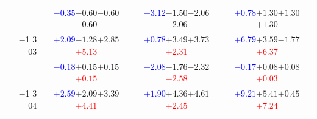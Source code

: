 \documentclass[compress]{beamer}
\begin{document}
\begin{frame}
\begin{tabular}{r | c | c | c}
          & \textcolor{blue}{$-0.35$}\hspace{0.1 cm}$-0.60$\hspace{0.1 cm}$-0.60$\hspace{0.1 cm}\textcolor{black}{$-0.60$} & \textcolor{blue}{$-3.12$}\hspace{0.1 cm}$-1.50$\hspace{0.1 cm}$-2.06$\hspace{0.1 cm}\textcolor{black}{$-2.06$} & \textcolor{blue}{$+0.78$}\hspace{0.1 cm}$+1.30$\hspace{0.1 cm}$+1.30$\hspace{0.1 cm}\textcolor{black}{$+1.30$} \\
$-$1 3 03 & \textcolor{blue}{$+2.09$}\hspace{0.1 cm}$-1.28$\hspace{0.1 cm}$+2.85$\hspace{0.1 cm}\textcolor{red}{$+5.13$} & \textcolor{blue}{$+0.78$}\hspace{0.1 cm}$+3.49$\hspace{0.1 cm}$+3.73$\hspace{0.1 cm}\textcolor{red}{$+2.31$} & \textcolor{blue}{$+6.79$}\hspace{0.1 cm}$+3.59$\hspace{0.1 cm}$-1.77$\hspace{0.1 cm}\textcolor{red}{$+6.37$} \\
          & \textcolor{blue}{$-0.18$}\hspace{0.1 cm}$+0.15$\hspace{0.1 cm}$+0.15$\hspace{0.1 cm}\textcolor{red}{$+0.15$} & \textcolor{blue}{$-2.08$}\hspace{0.1 cm}$-1.76$\hspace{0.1 cm}$-2.32$\hspace{0.1 cm}\textcolor{red}{$-2.58$} & \textcolor{blue}{$-0.17$}\hspace{0.1 cm}$+0.08$\hspace{0.1 cm}$+0.08$\hspace{0.1 cm}\textcolor{red}{$+0.03$} \\
$-$1 3 04 & \textcolor{blue}{$+2.59$}\hspace{0.1 cm}$+2.09$\hspace{0.1 cm}$+3.39$\hspace{0.1 cm}\textcolor{red}{$+4.41$} & \textcolor{blue}{$+1.90$}\hspace{0.1 cm}$+4.36$\hspace{0.1 cm}$+4.61$\hspace{0.1 cm}\textcolor{red}{$+2.45$} & \textcolor{blue}{$+9.21$}\hspace{0.1 cm}$+5.41$\hspace{0.1 cm}$+0.45$\hspace{0.1 cm}\textcolor{red}{$+7.24$} \\

\end{tabular}
\end{frame}
\end{document}
